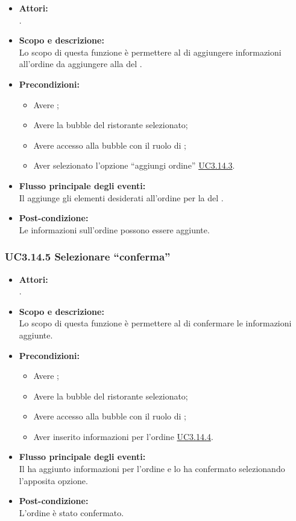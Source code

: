\begin{itemize}
	\item \textbf{Attori:}
	\\.
	\item \textbf{Scopo e descrizione:} 
	\\Lo scopo di questa funzione è permettere al  di aggiungere informazioni all’ordine da aggiungere alla  del .
	\item \textbf{Precondizioni:}
	\begin{itemize}
		\item Avere ;
		\item Avere la bubble del ristorante selezionato;
		\item Avere accesso alla bubble con il ruolo di ;
		\item Aver selezionato l’opzione “aggiungi ordine” \hyperref[UC3.14.3]{UC3.14.3}.
	\end{itemize}
	\item \textbf{Flusso principale degli eventi:}
	\\Il {} aggiunge gli elementi desiderati all’ordine per la  del .
	\item \textbf{Post-condizione:}
	\\Le informazioni sull’ordine possono essere aggiunte.
\end{itemize}

\subsubsection{UC3.14.5 Selezionare “conferma”} \label{UC3.14.5}

\begin{itemize}
	\item \textbf{Attori:}
	\\.
	\item \textbf{Scopo e descrizione:} 
	\\Lo scopo di questa funzione è permettere al  di confermare le informazioni aggiunte.
	\item \textbf{Precondizioni:}
	\begin{itemize}
		\item Avere ;
		\item Avere la bubble del ristorante selezionato;
		\item Avere accesso alla bubble con il ruolo di ;
		\item Aver inserito informazioni per l’ordine \hyperref[UC3.14.4]{UC3.14.4}.
	\end{itemize}
	\item \textbf{Flusso principale degli eventi:}
	\\Il {} ha aggiunto informazioni per l’ordine e lo ha confermato selezionando l’apposita opzione.
	\item \textbf{Post-condizione:}
	\\L’ordine è stato confermato.
\end{itemize}

